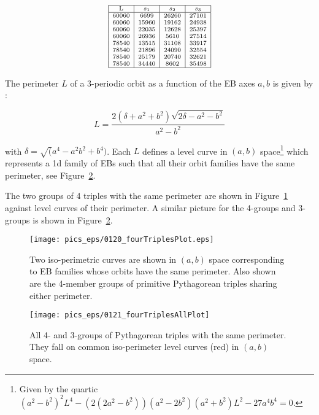 $$
\scriptsize
\begin{array}{|c|c|c|c|}
\hline
\text{L} & s_1 & s_2 & s_3 \\
\hline
 60060 & 6699 & 26260 & 27101 \\
 60060 & 15960 & 19162 & 24938 \\
 60060 & 22035 & 12628 & 25397 \\
 60060 & 26936 & 5610 & 27514 \\
 78540 & 13515 & 31108 & 33917 \\
 78540 & 21896 & 24090 & 32554 \\
 78540 & 25179 & 20740 & 32621 \\
 78540 & 34440 & 8602 & 35498 \\
 \hline
\end{array}
$$

The perimeter $L$ of a 3-periodic orbit as a function of the EB axes $a,b$ is given by \cite{ronaldo2020-loci}:

\begin{equation*}
L=\frac{2(\delta+a^2+b^2)\sqrt{2\delta-a^2-b^2}}{a^2-b^2}
\end{equation*}

\noindent with $\delta=\sqrt(a^4-a^2 b^2+b^4)$. Each $L$ defines a level curve in $(a,b)$ space\footnote{Given by the quartic $(a^2-b^2)^2 L^4-(2(2a^2-b^2))(a^2-2 b^2)(a^2+b^2) L^2-27 a^4 b^4=0$.} which represents a 1d family of EBs such that all their orbit families have the same perimeter, see Figure~\ref{fig:iso-perimeter-3-and-4}.

The two groups of 4 triples with the same perimeter are shown in Figure~\ref{fig:iso-perimeter-4} against level curves of their perimeter. A similar picture for the 4-groups and 3-groups is shown in Figure~\ref{fig:iso-perimeter-3-and-4}.

\begin{figure}[H]
    \centering
    \texttt{[image: pics\_eps/0120\_fourTriplesPlot.eps]}
    \caption{Two iso-perimetric curves are shown in $(a,b)$ space corresponding to EB families whose orbits have the same perimeter. Also shown are the 4-member groups of primitive Pythagorean triples sharing either perimeter.}
    \label{fig:iso-perimeter-4}
\end{figure}

\begin{figure}[H]
    \centering
    \texttt{[image: pics\_eps/0121\_fourTriplesAllPlot]}
    \caption{All 4- and 3-groups of Pythagorean triples with the same perimeter. They fall on common iso-perimeter level curves (red) in $(a,b)$ space.}
    \label{fig:iso-perimeter-3-and-4}
\end{figure}